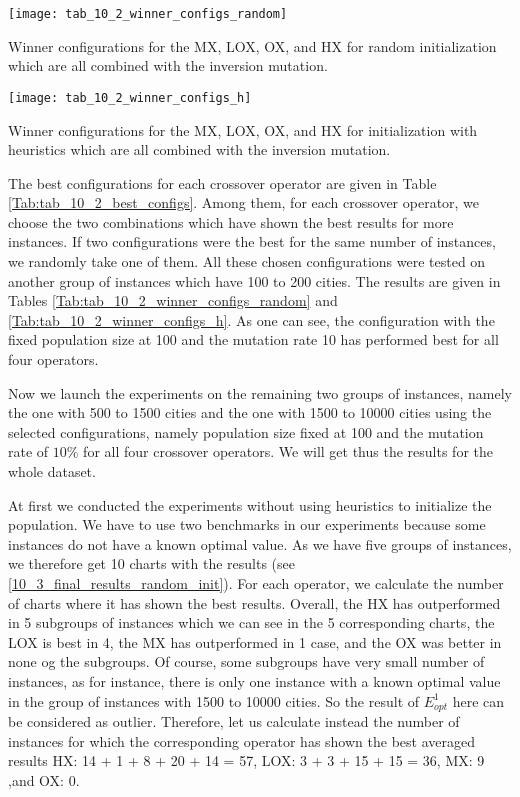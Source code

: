 \begin{table}[htp] \centering
	\texttt{[image: tab\_10\_2\_winner\_configs\_random]}
	\caption{Winner configurations for the MX, LOX, OX, and HX for random initialization which are all combined with the inversion mutation.}
	\label{Tab:tab_10_2_winner_configs_random}
\end{table}	 

\begin{table}[htp] \centering
	\texttt{[image: tab\_10\_2\_winner\_configs\_h]}
	\caption{Winner configurations for the MX, LOX, OX, and HX for initialization with heuristics which are all combined with the inversion mutation.}
	\label{Tab:tab_10_2_winner_configs_h}
\end{table}	 

The best configurations for each crossover operator are given in Table \ref{Tab:tab_10_2_best_configs}. Among them, for each crossover operator, we choose the two combinations which have shown the best results for more instances. If two configurations were the best for the same number of instances, we randomly take one of them. All these chosen configurations were tested on another group of instances which have 100 to 200 cities. The results are given in Tables \ref{Tab:tab_10_2_winner_configs_random} and \ref{Tab:tab_10_2_winner_configs_h}. As one can see, the configuration with the fixed population size at 100 and the mutation rate 10 has performed best for all four operators.\par 

Now we launch the experiments on the remaining two groups of instances, namely the one with 500 to 1500 cities and the one with 1500 to 10000 cities using the selected configurations, namely population size fixed at 100 and the mutation rate of $10\%$ for all four crossover operators. We will get thus the results for the whole dataset. \par 

At first we conducted the experiments without using heuristics to initialize the population. We have to use two benchmarks in our experiments because some instances do not have a known optimal value. As we have five groups of instances, we therefore get 10 charts with the results (see \ref{10_3_final_results_random_init}). For each operator, we calculate the number of charts where it has shown the best results. Overall, the HX has outperformed in 5 subgroups of instances which we can see in the 5 corresponding charts, the LOX is best in 4, the MX has outperformed in 1 case, and the OX was better in none og the subgroups. Of course, some subgroups have very small number of instances, as for instance, there is only one instance with a known optimal value in the group of instances with 1500 to 10000 cities. So the result of $E^{1}_{opt}$ here can be considered as outlier. Therefore, let us calculate instead the number of instances for which the corresponding operator has shown the best averaged results HX: 14 + 1 + 8 + 20 + 14 = 57, LOX: 3 + 3 + 15 + 15 = 36, MX: 9 ,and OX: 0. \par 

